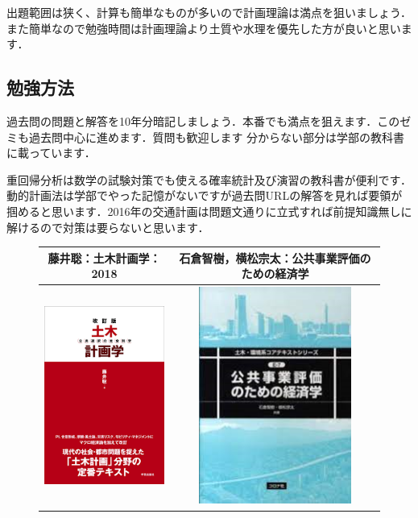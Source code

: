 \documentclass{jsarticle}
\begin{document}
出題範囲は狭く、計算も簡単なものが多いので計画理論は満点を狙いましょう．また簡単なので勉強時間は計画理論より土質や水理を優先した方が良いと思います．

\subsection{勉強方法}
過去問の問題と解答を10年分暗記しましょう．本番でも満点を狙えます．このゼミも過去問中心に進めます．質問も歓迎します
分からない部分は学部の教科書に載っています．

重回帰分析は数学の試験対策でも使える確率統計及び演習の教科書が便利です．
動的計画法は学部でやった記憶がないですが過去問URLの解答を見れば要領が掴めると思います．2016年の交通計画は問題文通りに立式すれば前提知識無しに解けるので対策は要らないと思います．

\begin{figure}[htbp]
  \begin{tabular}{c|c}
  藤井聡：土木計画学：2018&石倉智樹，横松宗太：公共事業評価のための経済学\\
  \hline
    \includegraphics[keepaspectratio, width=5cm]{figures/doboku.png}
  &
    \includegraphics[keepaspectratio, width=5cm]{figures/kokyo.png}

\end{tabular}
\end{figure}
\end{document}
